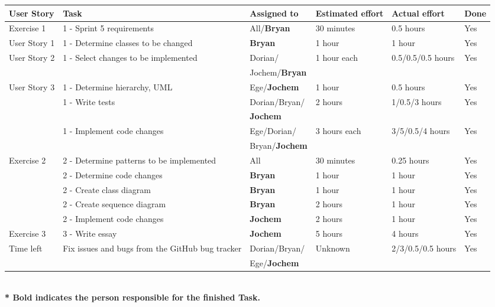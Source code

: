 \documentclass[10pt]{article}
\begin{document}
\begin{center}

    \hspace*{-3cm}\begin{tabular}{ | p{2cm} | p{9cm} | p{2.3cm} | p{2cm} | p{1.8cm} | p{0.8cm} |}
    \hline
    User Story & Task & Assigned to & Estimated effort & Actual effort & Done \\ \hline
    Exercise 1 & 1 - Sprint 5 requirements & All/\textbf{Bryan} & 30 minutes & 0.5  hours & Yes\\ 
    User Story 1 & 1 - Determine classes to be changed & \textbf{Bryan} & 1 hour & 1 hour & Yes\\
    User Story 2 & 1 - Select changes to be implemented & Dorian/ & 1 hour each & 0.5/0.5/0.5 hours & Yes\\ 
    & & Jochem/\textbf{Bryan} & & &\\
    User Story 3 & 1 - Determine hierarchy, UML & Ege/\textbf{Jochem} & 1 hour & 0.5 hours & Yes\\ 
    & 1 - Write tests & Dorian/Bryan/  & 2 hours & 1/0.5/3 hours & Yes\\
    & & \textbf{Jochem} & & &\\
    & 1 - Implement code changes & Ege/Dorian/ & 3 hours each & 3/5/0.5/4 hours & Yes\\ 
    & & Bryan/\textbf{Jochem} & & &\\ \hline    
    Exercise 2 & 2 - Determine patterns to be implemented & All & 30 minutes & 0.25 hours & Yes\\ 
    & 2 - Determine code changes & \textbf{Bryan} & 1 hour & 1 hour & Yes\\
    & 2 - Create class diagram & \textbf{Bryan} & 1 hour & 1 hour & Yes\\ 
    & 2 - Create sequence diagram & \textbf{Bryan} & 2 hours & 1 hour & Yes\\ 
    & 2 - Implement code changes & \textbf{Jochem} & 2 hours & 1 hour & Yes \\ \hline    
    Exercise 3 & 3 - Write essay & \textbf{Jochem} & 5 hours & 4 hours & Yes\\
    Time left & Fix issues and bugs from the GitHub bug tracker & Dorian/Bryan/ & Unknown & 2/3/0.5/0.5 hours& Yes\\  
    & & Ege/\textbf{Jochem} & & &\\ \hline    
    \end{tabular}
    \\ 
    \textbf{* Bold indicates the person responsible for the finished Task. } 
\end{center}
\end{document}

